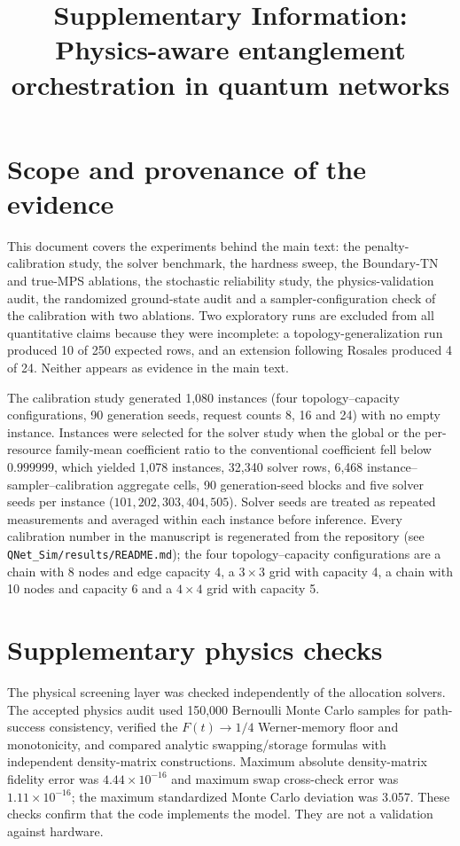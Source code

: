 \documentclass[pdflatex,sn-nature]{sn-jnl}
\begin{document}
\title{Supplementary Information: Physics-aware entanglement orchestration in quantum networks}
\author*[1]{ }
\maketitle

\section{Scope and provenance of the evidence}
This document covers the experiments behind the main text: the penalty-calibration study, the solver benchmark, the hardness sweep, the Boundary-TN and true-MPS ablations, the stochastic reliability study, the physics-validation audit, the randomized ground-state audit and a sampler-configuration check of the calibration with two ablations. Two exploratory runs are excluded from all quantitative claims because they were incomplete: a topology-generalization run produced 10 of 250 expected rows, and an extension following Rosales produced 4 of 24. Neither appears as evidence in the main text.

The calibration study generated 1,080 instances (four topology--capacity configurations, 90 generation seeds, request counts 8, 16 and 24) with no empty instance. Instances were selected for the solver study when the global or the per-resource family-mean coefficient ratio to the conventional coefficient fell below $0.999999$, which yielded 1,078 instances, 32,340 solver rows, 6,468 instance--sampler--calibration aggregate cells, 90 generation-seed blocks and five solver seeds per instance ($101,202,303,404,505$). Solver seeds are treated as repeated measurements and averaged within each instance before inference. Every calibration number in the manuscript is regenerated from the repository (see \texttt{QNet\_Sim/results/README.md}); the four topology--capacity configurations are a chain with 8 nodes and edge capacity 4, a $3\times3$ grid with capacity 4, a chain with 10 nodes and capacity 6 and a $4\times4$ grid with capacity 5.

\section{Supplementary physics checks}
The physical screening layer was checked independently of the allocation solvers. The accepted physics audit used 150,000 Bernoulli Monte Carlo samples for path-success consistency, verified the $F(t)\rightarrow1/4$ Werner-memory floor and monotonicity, and compared analytic swapping/storage formulas with independent density-matrix constructions. Maximum absolute density-matrix fidelity error was $4.44\times10^{-16}$ and maximum swap cross-check error was $1.11\times10^{-16}$; the maximum standardized Monte Carlo deviation was 3.057. These checks confirm that the code implements the model. They are not a validation against hardware.
\end{document}
